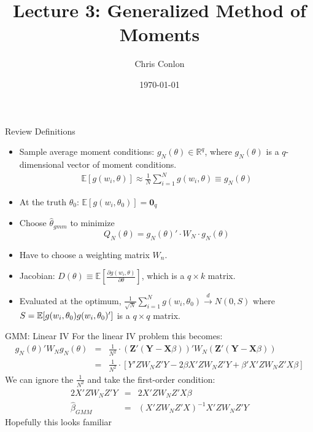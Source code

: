 



\title{Lecture 3: Generalized Method of Moments}
\author{Chris Conlon }



\date{\today}


\maketitle


 

\begin{frame}{Review Definitions}

\begin{itemize}
\item Sample average moment conditions: $g_N(\theta) \in \mathbb{R}^q$, where $g_N(\theta)$ is a $q$-dimensional vector of moment conditions.
\begin{eqnarray*}
\mathbb{E}[g(w_i, \theta )] \approx \frac{1}{N} \sum_{i=1}^N g(w_i, \theta)  \equiv g_N(\theta)
\end{eqnarray*}
\item At the truth $\theta_0$: $\mathbb{E}[g(w_i, \theta_0 )] =\mathbf{0}_q$
\item Choose $\widehat{\theta}_{gmm}$ to minimize $$Q_N(\theta)=g_N(\theta)' \cdot W_N \cdot  g_N(\theta)$$
\item Have to choose a weighting matrix $W_n$.
\item Jacobian: $D(\theta) \equiv \mathbb{E}[\frac{\partial g(w_i,\theta)}{\partial \theta}]$, which is a $q \times k$ matrix.
\item  Evaluated at the optimum, $\frac{1}{\sqrt{N}} \sum_{i=1}^N g(w_i,\theta_0) \overset{d}{\to} N(0,S)$ where $S = \mathbb{E}[g(w_i,\theta_0) g(w_i,\theta_0)']$ is a $q \times q$ matrix.
\end{itemize}
\end{frame}


\begin{frame}{GMM: Linear IV}
For the linear IV problem this becomes:
\begin{eqnarray*}
g_N(\theta)' W_N  g_N(\theta) &=& \frac{1}{N^2} \cdot (\mathbf{Z}' (\mathbf{Y} - \mathbf{X} \beta))' W_N (\mathbf{Z}' (\mathbf{Y} - \mathbf{X} \beta)) \\
&=& \frac{1}{N^2}\cdot [Y'Z W_N Z' Y - 2 \beta X' Z W_N Z' Y + \beta' X' Z W_N Z' X \beta]
\end{eqnarray*}
We can ignore the $\frac{1}{N^2}$ and take the first-order condition:
\begin{eqnarray*}
2 X'Z W_N Z' Y &=& 2 X'Z W_N Z' X \beta\\
\hat{\beta}_{GMM} &=& (X'Z W_N Z' X)^{-1} X' Z W_N Z'Y
\end{eqnarray*}
\alert{Hopefully this looks familiar}
\end{frame}

